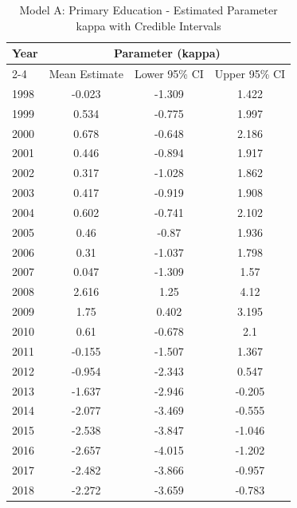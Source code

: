 \begin{landscape}
\begin{table}[htbp]
\centering
\caption{Model A: Primary Education - Estimated Parameter kappa with Credible Intervals}
\label{tab:Fparameters_k2}
\begin{tabular}{@{}lccc@{}}
\toprule
Year & \multicolumn{3}{c}{Parameter (kappa)} \\
\cmidrule(lr){2-4}
      & Mean Estimate & Lower 95\% CI & Upper 95\% CI \\
\midrule
1998 & -0.023 & -1.309 & 1.422 \\
1999 & 0.534 & -0.775 & 1.997 \\
2000 & 0.678 & -0.648 & 2.186 \\
2001 & 0.446 & -0.894 & 1.917 \\
2002 & 0.317 & -1.028 & 1.862 \\
2003 & 0.417 & -0.919 & 1.908 \\
2004 & 0.602 & -0.741 & 2.102 \\
2005 & 0.46 & -0.87 & 1.936 \\
2006 & 0.31 & -1.037 & 1.798 \\
2007 & 0.047 & -1.309 & 1.57 \\
2008 & 2.616 & 1.25 & 4.12 \\
2009 & 1.75 & 0.402 & 3.195 \\
2010 & 0.61 & -0.678 & 2.1 \\
2011 & -0.155 & -1.507 & 1.367 \\
2012 & -0.954 & -2.343 & 0.547 \\
2013 & -1.637 & -2.946 & -0.205 \\
2014 & -2.077 & -3.469 & -0.555 \\
2015 & -2.538 & -3.847 & -1.046 \\
2016 & -2.657 & -4.015 & -1.202 \\
2017 & -2.482 & -3.866 & -0.957 \\
2018 & -2.272 & -3.659 & -0.783 \\
\bottomrule
\end{tabular}
\end{table}
\end{landscape}
